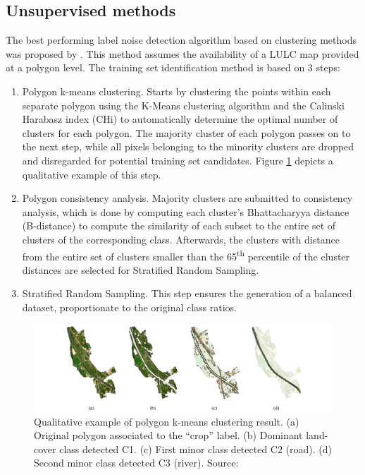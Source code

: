 \documentclass[12pt, english, openany]{book}
\begin{document}
\subsection*{Unsupervised methods}

The best performing label noise detection algorithm based on clustering methods
was proposed by \cite{Paris2019}. This method assumes the availability
of a LULC map provided at a polygon level. The training set identification
method is based on 3 steps:
\begin{enumerate}
  \item Polygon k-means clustering. Starts by clustering the points within each
        separate polygon using the K-Means clustering algorithm and the Calinski
        Harabasz index (CHi) to automatically determine the optimal number of clusters
        for each polygon. The majority cluster of each polygon passes on to the next
        step, while all pixels belonging to the minority clusters are dropped and
        disregarded for potential training set candidates. Figure
        \ref{fig:paris-kmeans} depicts a qualitative example of this step.

  \item Polygon consistency analysis. Majority clusters are submitted to consistency
        analysis, which is done by computing each cluster's Bhattacharyya distance
        (B-distance) to compute the similarity of each subset to the entire set of
        clusters of the corresponding class. Afterwards, the clusters with distance
        from the entire set of clusters smaller than the 65\textsuperscript{th}
        percentile of the cluster distances are selected for Stratified Random
        Sampling.

  \item Stratified Random Sampling. This step ensures the generation of a balanced
        dataset, proportionate to the original class ratios.
\end{enumerate}

\begin{figure}[H]
  \centering
  \includegraphics[width=1\linewidth]{paris_kmeans_results.png}
  \caption[Qualitative example of polygon k-means clustering result.]{Qualitative example of polygon k-means clustering result. (a) Original polygon
    associated to the “crop” label. (b) Dominant land-cover class detected C1. (c)
    First minor class detected C2 (road). (d) Second minor class detected C3
    (river). Source: \cite{Paris2019}}
  \label{fig:paris-kmeans}
\end{figure}
\end{document}
